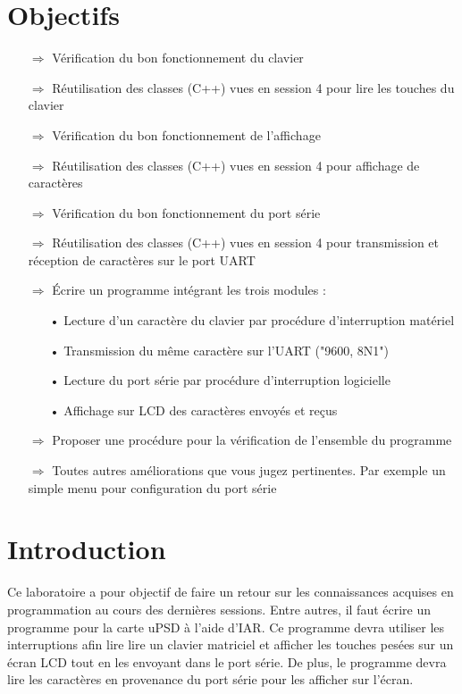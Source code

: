 \documentclass[10pt,a4paper,final]{article}
\begin{document}
%

\section{Objectifs}
\begin{itemize}
\item[$\Rightarrow$]Vérification du bon fonctionnement du clavier
\item[$\Rightarrow$]Réutilisation des classes (C++) vues en session 4 pour lire les touches du clavier
\item[$\Rightarrow$]Vérification du bon fonctionnement de l’affichage
\item[$\Rightarrow$]Réutilisation des classes (C++) vues en session 4 pour affichage de caractères
\item[$\Rightarrow$]Vérification du bon fonctionnement du port série
\item[$\Rightarrow$]Réutilisation des  classes (C++) vues en session 4  pour transmission et réception de caractères sur le port UART
\item[$\Rightarrow$]Écrire un programme intégrant les trois modules :
\begin{itemize}
\item[•]Lecture d'un caractère du clavier par procédure d’interruption matériel 
\item[•]Transmission du même caractère sur l’UART ("9600, 8N1") 
\item[•]Lecture du port série par procédure d’interruption logicielle 
\item[•]Affichage sur LCD des caractères envoyés et reçus 
\end{itemize}
\item[$\Rightarrow$]Proposer une procédure pour la vérification de l’ensemble du programme
\item[$\Rightarrow$]Toutes autres améliorations que vous jugez pertinentes. Par exemple un simple menu pour configuration du port série
\end{itemize}


\section{Introduction}
Ce laboratoire a pour objectif de faire un retour sur les connaissances acquises en programmation au cours des dernières sessions. Entre autres, il faut écrire un programme pour la carte uPSD à l'aide d'IAR. Ce programme devra utiliser les interruptions afin lire lire un clavier matriciel et afficher les touches pesées sur un écran LCD tout en les envoyant dans le port série. De plus, le programme devra lire les caractères en provenance du port série pour les afficher sur l’écran.
\end{document}
